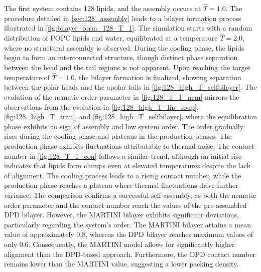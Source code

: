 \documentclass[
    11pt,
    a4paper,
    oneside,        %
    BCOR=10mm,      %
    parskip=half,   %
    listof=nototoc,   %
    bibliography=totoc %
]{scrreprt}
\begin{document}
The first system contains 128 lipids, and the assembly occurs at $\hat{T} = 1.0$. The procedure detailed in \cref{sec:128_assembly} leads to a bilayer formation process illustrated in \cref{fig:bilayer_form_128_T_1}. The simulation starts with a random distribution of POPC lipids and water, equilibrated at a temperature $\hat{T} = 2.0$, where no structural assembly is observed. During the cooling phase, the lipids begin to form an interconnected structure, though distinct phase separation between the head and the tail regions is not apparent. Upon reaching the target temperature of $\hat{T} = 1.0$, the bilayer formation is finalized, showing separation between the polar heads and the apolar tails in \cref{fig:128_high_T_selfbilayer}. The evolution of the nematic order parameter in \cref{fig:128_T_1_nem} mirrors the observations from the evolution in \cref{fig:128_high_T_lip_soup}, \cref{fig:128_high_T_tran}, and \cref{fig:128_high_T_selfbilayer}, where the equilibration phase exhibits no sign of assembly and low system order. The order gradually rises during the cooling phase and plateaus in the production phases. The production phase exhibits fluctuations attributable to thermal noise. The contact number in \cref{fig:128_T_1_con} follows a similar trend, although an initial rise indicates that lipids form clumps even at elevated temperatures despite the lack of alignment. The cooling process leads to a rising contact number, while the production phase reaches a plateau where thermal fluctuations drive further variance. The comparison confirms a successful self-assembly, as both the nematic order parameter and the contact number reach the values of the pre-assembled DPD bilayer. However, the MARTINI bilayer exhibits significant deviations, particularly regarding the system's order. The MARTINI bilayer attains a mean value of approximately 0.8, whereas the DPD bilayer reaches maximum values of only 0.6. Consequently, the MARTINI model allows for significantly higher alignment than the DPD-based approach. Furthermore, the DPD contact number remains lower than the MARTINI value, suggesting a lower packing density.
\end{document}
